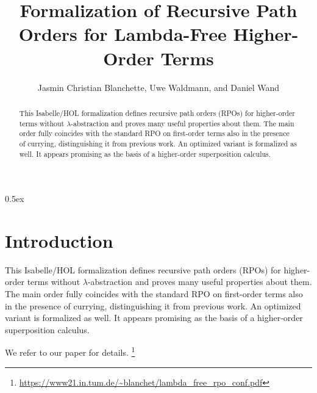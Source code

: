 \documentclass[10pt,a4paper]{article}
\begin{document}
\title{Formalization of Recursive Path Orders for Lambda-Free Higher-Order Terms}
\author{Jasmin Christian Blanchette, Uwe Waldmann, and Daniel Wand}

\maketitle

\begin{abstract}
\noindent
This Isabelle/HOL formalization defines recursive path orders (RPOs) for
higher-order terms without $\lambda$-abstraction and proves many useful
properties about them. The main order fully coincides with the standard RPO on
first-order terms also in the presence of currying, distinguishing it from
previous work. An optimized variant is formalized as well. It appears
promising as the basis of a higher-order superposition calculus.
\end{abstract}

\tableofcontents

\parindent 0pt
\parskip 0.5ex

\section{Introduction}

This Isabelle/HOL formalization defines recursive path orders (RPOs) for
higher-order terms without $\lambda$-abstraction and proves many useful
properties about them. The main order fully coincides with the standard RPO on
first-order terms also in the presence of currying, distinguishing it from
previous work. An optimized variant is formalized as well. It appears
promising as the basis of a higher-order superposition calculus.

We refer to our paper for details.%
\footnote{\url{https://www21.in.tum.de/~blanchet/lambda_free_rpo_conf.pdf}}



%
%

%
%
\end{document}

